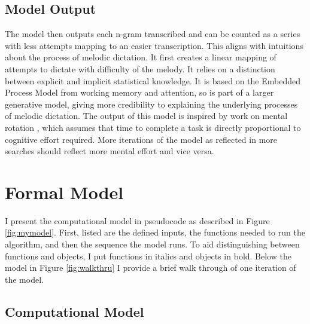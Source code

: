 \documentclass[12pt,]{book}
\begin{document}
\hypertarget{model-output}{%
\subsection{Model Output}\label{model-output}}

The model then outputs each n-gram transcribed and can be counted as a series with less attempts mapping to an easier transcription.
This aligns with intuitions about the process of melodic dictation.
It first creates a linear mapping of attempts to dictate with difficulty of the melody.
It relies on a distinction between explicit and implicit statistical knowledge.
It is based on the Embedded Process Model from working memory and attention, so is part of a larger generative model, giving more credibility to explaining the underlying processes of melodic dictation.
The output of this model is inspired by work on mental rotation \citep{shepardMentalRotationThreeDimensional1971}, which assumes that time to complete a task is directly proportional to cognitive effort required.
More iterations of the model as reflected in more searches should reflect more mental effort and vice versa.

\hypertarget{formal-model}{%
\section{Formal Model}\label{formal-model}}

I present the computational model in pseudocode as described in Figure \ref{fig:mymodel}.
First, listed are the defined inputs, the functions needed to run the algorithm, and then the sequence the model runs.
To aid distinguishing between functions and objects, I put functions in italics and objects in bold.
Below the model in Figure \ref{fig:walkthru} I provide a brief walk through of one iteration of the model.

\hypertarget{computational-model-1}{%
\subsection{Computational Model}\label{computational-model-1}}
\end{document}
